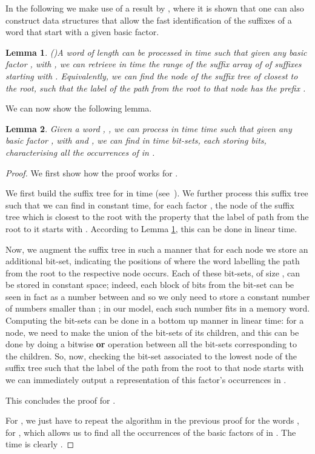 \documentclass[final]{dmtcs-episciences}
\newtheorem{lemma}{Lemma}
\begin{document}
In the following we make use of a result by \cite{Gawrychowski11}, where it is shown that one can also construct data structures that allow the fast identification of the suffixes of a word that start with a given basic factor.
\begin{lemma}(\cite{Gawrychowski11})\label{find_node}
A word  of length  can be processed in  time such that given any basic factor , with , we can retrieve in  time the range of the suffix array of  of suffixes starting with . Equivalently, we can find the node of the suffix tree of  closest to the root, such that the label of the path from the root to that node has the prefix .
\end{lemma}
We can now show the following lemma. 
\begin{lemma}\label{find_occ_small}
Given a word , , we can process  in time  time such that given any basic factor , with  and , we can find in  time  bit-sets, each storing  bits, characterising all the occurrences of  in .
\end{lemma}
\begin{proof}
We first show how the proof works for . 

We first build the suffix tree for  in  time (see~\cite{Farach97}). We further process this suffix tree such that we can find in constant time, for each factor , the node of the suffix tree which is closest to the root with the property that the label of path from the root to it starts with . According to Lemma \ref{find_node}, this can be done in linear time. 

Now, we augment the suffix tree in such a manner that for each node we store an additional bit-set, indicating the positions of  where the word labelling the path from the root to the respective node occurs. Each of these bit-sets, of size , can be stored in constant space; indeed, each  block of bits from the bit-set can be seen in fact as a number between  and  so we only need to store a constant number of numbers smaller than ; in our model, each such number fits in a memory word. Computing the bit-sets can be done in a bottom up manner in linear time: for a node, we need to make the union of the bit-sets of its children, and this can be done by doing a bitwise {\bf or} operation between all the bit-sets corresponding to the children. So, now, checking the bit-set associated to the lowest node of the suffix tree such that the label of the path from the root to that node starts with  we can immediately output a representation of this factor's occurrences in .

This concludes the proof for . 

For , we just have to repeat the algorithm in the previous proof for the words , for , which allows us to find all the occurrences of the basic factors of  in . The time is clearly . 

\end{proof}
\end{document}
